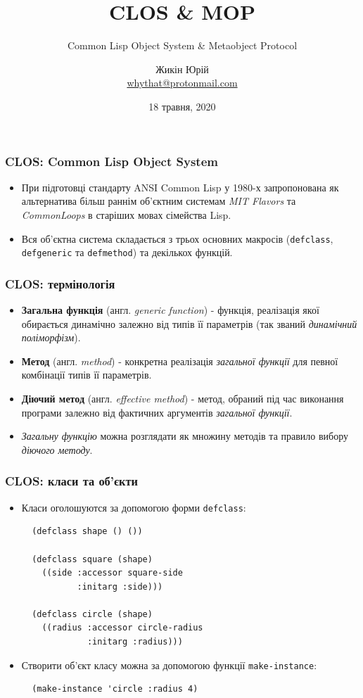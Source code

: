 \documentclass{beamer}
\title{CLOS \& MOP}
\subtitle{Common Lisp Object System \& Metaobject Protocol}
\author{ Жикін Юрій \\ \url{whythat@protonmail.com}}
\date{18 травня, 2020}
\begin{document}
\frame{\titlepage}

\begin{frame}[fragile]
  \frametitle{CLOS: Common Lisp Object System}
  \begin{itemize}
  \item При підготовці стандарту ANSI Common Lisp у 1980-х запропонована як
    альтернатива більш раннім об'єктним системам \textit{MIT Flavors} та
    \textit{CommonLoops} в старіших мовах сімейства Lisp.
  \item Вся об'єктна система складається з трьох основних макросів
    (\texttt{defclass}, \texttt{defgeneric} та \texttt{defmethod}) та декількох
    функцій.
  \end{itemize}
\end{frame}

\begin{frame}[fragile]
  \frametitle{CLOS: термінологія}
  \begin{itemize}
  \item \textbf{Загальна функція} (англ. \textit{generic function}) - функція,
    реалізація якої обирається динамічно залежно від типів її параметрів (так
    званий \textit{динамічний поліморфізм}).
  \item \textbf{Метод} (англ. \textit{method}) - конкретна реалізація
    \textit{загальної функції} для певної комбінації типів її параметрів.
  \item \textbf{Діючий метод} (англ. \textit{effective method}) - метод, обраний
    під час виконання програми залежно від фактичних аргументів
    \textit{загальної функції}.
  \item \textit{Загальну функцію} можна розглядати як множину методів та правило
    вибору \textit{діючого методу}.
  \end{itemize}
\end{frame}

\begin{frame}[fragile]
  \frametitle{CLOS: класи та об'єкти}
  \begin{itemize}
  \item Класи оголошуются за допомогою форми \texttt{defclass}:
    \begin{lstlisting}
  (defclass shape () ())

  (defclass square (shape)
    ((side :accessor square-side 
           :initarg :side)))

  (defclass circle (shape)
    ((radius :accessor circle-radius 
             :initarg :radius)))
    \end{lstlisting}
  \item Створити об'єкт класу можна за допомогою функції \texttt{make-instance}:
    \begin{lstlisting}
  (make-instance 'circle :radius 4)
    \end{lstlisting}
  \end{itemize}
\end{frame}
\end{document}
